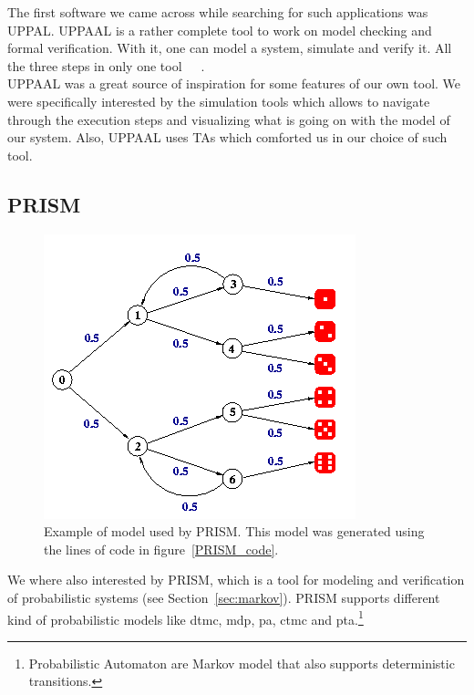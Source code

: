 \documentclass[12pt]{article}
\theoremstyle{definition}
\theoremstyle{definition}
\theoremstyle{remark}
\begin{document}
The first software we came across while searching for such applications was UPPAL. UPPAAL is a rather complete tool to work on model checking and formal verification. With it, one can model a system, simulate and verify it. All the three steps in only one tool~\cite{Bengtsson1996}~\cite{Behrmann2004}~\cite{Larsen1997}.\\

UPPAAL was a great source of inspiration for some features of our own tool. We were specifically interested by the simulation tools which allows to navigate through the execution steps and visualizing what is going on with the model of our system. Also, UPPAAL uses TAs which comforted us in our choice of such tool.\\


\subsection{PRISM}

\begin{figure}
    \centering
    \includegraphics[scale=0.6]{PRISM_model.png}
    \caption{Example of model used by PRISM. This model was generated using the lines of code in figure~\ref{PRISM_code}.}
    \label{PRISM_model}
\end{figure}

We where also interested by PRISM, which is a tool for modeling and verification of probabilistic systems (see Section~\ref{sec:markov}). PRISM supports different kind of probabilistic models like \gls{dtmc}, \gls{mdp}, \gls{pa}, \gls{ctmc} and \gls{pta}.\footnote{Probabilistic Automaton are Markov model that also supports deterministic transitions.}~\cite{Kwiatkowska2011}~\cite{Hinton2006}\\
\end{document}
